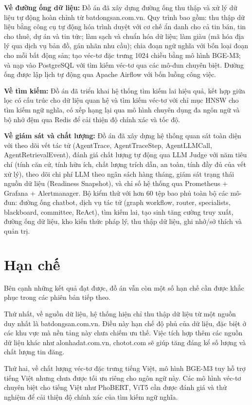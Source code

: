 \textbf{Về đường ống dữ liệu:} Đồ án đã xây dựng đường ống thu thập và xử lý dữ liệu tự động hoàn chỉnh từ batdongsan.com.vn. Quy trình bao gồm: thu thập dữ liệu bằng công cụ tự động hóa trình duyệt với cơ chế ẩn danh cho cả tin bán, tin cho thuê, dự án và tin tức; làm sạch và chuẩn hóa dữ liệu; làm giàu (mã hóa địa lý qua dịch vụ bản đồ, gán nhãn nhu cầu); chia đoạn ngữ nghĩa với bốn loại đoạn cho mỗi bất động sản; tạo véc-tơ đặc trưng 1024 chiều bằng mô hình BGE-M3; và nạp vào PostgreSQL với tìm kiếm véc-tơ qua các mô-đun chuyên biệt. Đường ống được lập lịch tự động qua Apache Airflow với bốn luồng công việc.

\textbf{Về tìm kiếm:} Đồ án đã triển khai hệ thống tìm kiếm lai hiệu quả, kết hợp giữa lọc có cấu trúc cho dữ liệu quan hệ và tìm kiếm véc-tơ với chỉ mục HNSW cho tìm kiếm ngữ nghĩa, có xếp hạng lại qua mô hình chuyên dụng đa ngôn ngữ và bộ nhớ đệm qua Redis để cải thiện độ chính xác và tốc độ.

\textbf{Về giám sát và chất lượng:} Đồ án đã xây dựng hệ thống quan sát toàn diện với theo dõi vết tác tử (AgentTrace, AgentTraceStep, AgentLLMCall, AgentRetrievalEvent), đánh giá chất lượng tự động qua LLM Judge với năm tiêu chí (tính căn cứ, tính hữu ích, chất lượng trích dẫn, an toàn, tính đầy đủ của vết xử lý), theo dõi chi phí LLM theo ngân sách hàng tháng, giám sát trạng thái nguồn dữ liệu (Readiness Snapshot), và chỉ số hệ thống qua Prometheus + Grafana + Alertmanager. Bộ kiểm thử với hơn 60 tệp bao phủ toàn bộ các mô-đun: đường ống chatbot, dịch vụ tác tử (graph workflow, router, specialists, blackboard, committee, ReAct), tìm kiếm lai, tạo sinh tăng cường truy xuất, đường ống dữ liệu, kho kiến thức pháp lý, thu thập dữ liệu, ghi nhớ/sở thích và quản trị.

\section*{Hạn chế}

Bên cạnh những kết quả đạt được, đồ án vẫn còn một số hạn chế cần được khắc phục trong các phiên bản tiếp theo.

Thứ nhất, về nguồn dữ liệu, hệ thống hiện chỉ thu thập dữ liệu từ một nguồn duy nhất là batdongsan.com.vn. Điều này hạn chế độ phủ của dữ liệu, đặc biệt ở các khu vực mà nền tảng này chưa chiếm ưu thế. Việc tích hợp thêm các nguồn dữ liệu khác như alonhadat.com.vn, chotot.com sẽ giúp tăng đáng kể số lượng và chất lượng tin đăng.

Thứ hai, về chất lượng véc-tơ đặc trưng tiếng Việt, mô hình BGE-M3 tuy hỗ trợ tiếng Việt nhưng chưa được tối ưu riêng cho ngôn ngữ này. Các mô hình véc-tơ chuyên biệt cho tiếng Việt như PhoBERT, ViT5 cần được đánh giá và thử nghiệm để cải thiện độ chính xác của tìm kiếm ngữ nghĩa.

